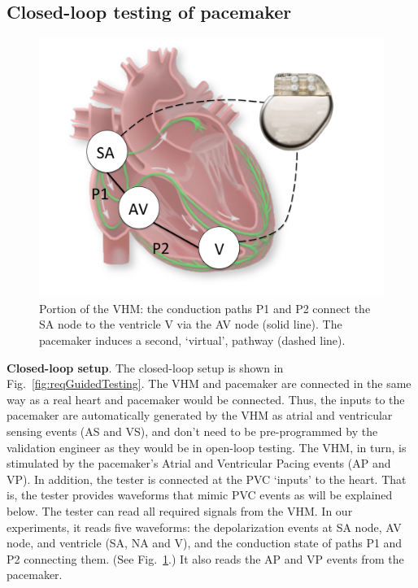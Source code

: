 \subsection{Closed-loop testing of pacemaker}
\label{closedloop}

\begin{figure}[t]
\centering
\includegraphics[scale=0.2]{figures/nodesandPM}
\caption{Portion of the VHM: the conduction paths P1 and P2 connect the SA node to the ventricle V via the AV node (solid line). The pacemaker induces a second, `virtual', pathway (dashed line).}
\label{fig:nodesandPM}
\vspace{-.5cm}
\end{figure}

\textbf{Closed-loop setup}.
The closed-loop setup is shown in Fig.~\ref{fig:reqGuidedTesting}.
The VHM and pacemaker are connected in the same way as a real heart and pacemaker would be connected.
Thus, the inputs to the pacemaker are automatically generated by the VHM as atrial and ventricular sensing events (AS and VS), and don't need to be pre-programmed by the validation engineer as they would be in open-loop testing. 
The VHM, in turn, is stimulated by the pacemaker's Atrial and Ventricular Pacing events (AP and VP).
In addition, the tester is connected at the PVC `inputs' to the heart.
That is, the tester provides waveforms that mimic PVC events as will be explained below.
The tester can read all required signals from the VHM.
In our experiments, it reads five waveforms: the depolarization events at SA node, AV node, and ventricle (SA, NA and V), and the conduction state of paths P1 and P2 connecting them. (See Fig.~\ref{fig:nodesandPM}.)
It also reads the AP and VP events from the pacemaker.

